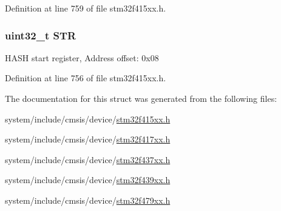 Definition at line 759 of file stm32f415xx.\+h.

\subsubsection[{\texorpdfstring{S\+TR}{STR}}]{ uint32\+\_\+t S\+TR}\hypertarget{struct_h_a_s_h___type_def_a7060ac1ed928ee931d7664650f2dcf75}{}\label{struct_h_a_s_h___type_def_a7060ac1ed928ee931d7664650f2dcf75}
H\+A\+SH start register, Address offset\+: 0x08 

Definition at line 756 of file stm32f415xx.\+h.



The documentation for this struct was generated from the following files\+:\begin{DoxyCompactItemize}
\item 
system/include/cmsis/device/\hyperlink{stm32f415xx_8h}{stm32f415xx.\+h}\item 
system/include/cmsis/device/\hyperlink{stm32f417xx_8h}{stm32f417xx.\+h}\item 
system/include/cmsis/device/\hyperlink{stm32f437xx_8h}{stm32f437xx.\+h}\item 
system/include/cmsis/device/\hyperlink{stm32f439xx_8h}{stm32f439xx.\+h}\item 
system/include/cmsis/device/\hyperlink{stm32f479xx_8h}{stm32f479xx.\+h}\end{DoxyCompactItemize}
